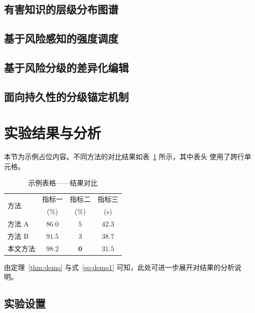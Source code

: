 \subsection{有害知识的层级分布图谱}

\subsection{基于风险感知的强度调度}

\subsection{基于风险分级的差异化编辑}

\subsection{面向持久性的分级锚定机制}

\section{实验结果与分析}
本节为示例占位内容。不同方法的对比结果如表~\ref{tab:results} 所示，其中表头
使用了跨行单元格。

\begin{table}[htbp]
  \centering
  \caption{示例表格——结果对比}
  \label{tab:results}
  \begin{tabular}{lccc}
    \toprule
    \multirow{2}{*}{方法} & 指标一 & 指标二 & 指标三 \\
                          & (\%)   & (\%)   & (s)    \\
    \midrule
    方法 A     & $86.0$ & $5$ & $42.3$ \\
    方法 B     & $91.5$ & $3$ & $38.7$ \\
    本文方法   & $\mathbf{98.2}$ & $\mathbf{0}$ & $\mathbf{31.5}$ \\
    \bottomrule
  \end{tabular}
\end{table}

由定理~\ref{thm:demo} 与式~\eqref{eq:demo1} 可知，此处可进一步展开对结果的分析说明。

\subsection{实验设置}

